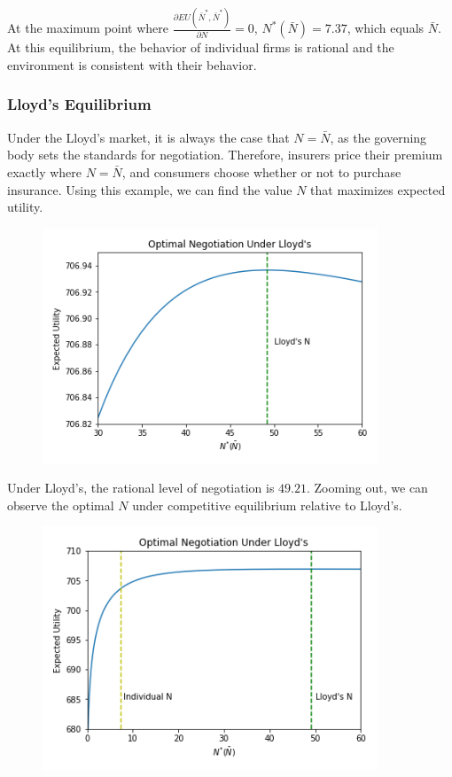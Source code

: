 \documentclass[12pt]{article}
\theoremstyle{plain}
\begin{document}
\newpage
At the maximum point where $\frac{\partial EU(\bar{N}^*, \bar{N}^*)}{\partial N} = 0$, $N^*(\bar{N})=7.37$, which equals $\bar{N}$. At this equilibrium, the behavior of individual firms is rational and the environment is consistent with their behavior.

\subsubsection{Lloyd's Equilibrium}

Under the Lloyd's market, it is always the case that $N = \bar{N}$, as the governing body sets the standards for negotiation. Therefore, insurers price their premium exactly where $N = \bar{N}$, and consumers choose whether or not to purchase insurance. Using this example, we can find the value $N$ that maximizes expected utility.

\begin{figure}[h]
\centering
\includegraphics[width=10cm]{lloyds2.png}
\end{figure}

\newpage
Under Lloyd's, the rational level of negotiation is $49.21$. Zooming out, we can observe the optimal $N$ under competitive equilibrium relative to Lloyd's. 

\begin{figure}[h]
\centering
\includegraphics[width=10cm]{lloyds1.png}
\end{figure}
\end{document}
